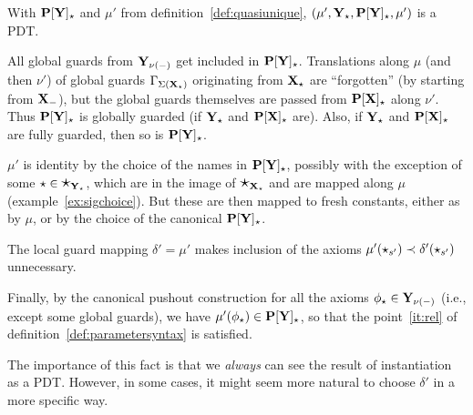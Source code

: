 %
\begin{proposition}\label{prop:paramtoo}
With $\thr{P[Y]_\cons}$ and $\mu'$ from definition~\ref{def:quasiunique}, 
$\pdtsp{\mu'}{\mu'}{\thr{Y_\cons}}{\thr{P[Y]_\cons}}$ is a PDT.
\end{proposition} 
\begin{PROOF}
All global guards from $\thr{Y_{\nu(\weak)}}$ get included in
$\thr{P[Y]_\cons}$. 
Translations along $\mu$ (and then $\nu'$) of global guards
$\Modax_{\Sigma({\thr{X_{\cons}}})}$ originating from $\thr{X_\cons}$ are
``forgotten'' (by starting from $\thr{X_\weak}$), but the global guards
themselves are passed from $\thr{P[X]_\cons}$ along $\nu'$. 
Thus $\thr{P[Y]_\cons}$ is globally guarded (if $\thr{Y_\cons}$ and
$\thr{P[X]_\cons}$ are). Also, if
$\thr{Y_\cons}$ and $\thr{P[X]_\cons}$ are fully guarded, then so is $\thr{P[Y]_\cons}$.

$\mu'$ is identity by the choice of the names in $\thr{P[Y]_\cons}$, possibly
with the exception of some $\cons\in\Cons_{\thr Y_{\cons}}$, which are in the image of
 $\Cons_{\thr X_{\cons}}$ and are mapped along $\mu$
(example~\ref{ex:sigchoice}). But these are then mapped to fresh constants,
either as by $\mu$, or by the choice of the canonical $\thr{P[Y]_\cons}$.

The local guard mapping $\delta'=\mu'$ makes inclusion of the axioms 
$\mu'(\cons_{s'})\prec \delta'(\cons_{s'})$ unnecessary. 

Finally, by the canonical pushout construction for all
 the axioms  $\phi_\cons\in\thr{Y_{\nu(\weak)}}$
(i.e., except some global guards), we have
 $\mu'(\phi_\cons)\in\thr{P[Y]_\cons}$, so that the point~\ref{it:rel} of
definition~\ref{def:parametersyntax} is satisfied.
\end{PROOF}
%
The importance of this fact is that we {\em always} can see the result of
instantiation as a PDT. However, 
in some cases, it might seem more natural to choose $\delta'$ in a more
specific way.
